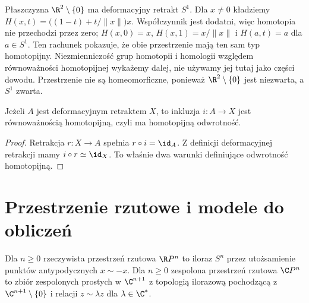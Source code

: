 \begin{przyklad}
Płaszczyzna $\R^2\setminus\{0\}$ ma deformacyjny retrakt $S^1$.
Dla $x\ne0$ kładziemy
$H(x,t)=\big((1-t)+t/\|x\|\big)x$.
Współczynnik jest dodatni, więc homotopia nie przechodzi przez zero;
$H(x,0)=x$, $H(x,1)=x/\|x\|$ i $H(a,t)=a$ dla $a\in S^1$.
Ten rachunek pokazuje, że obie przestrzenie mają ten sam
typ homotopijny. Niezmienniczość grup homotopii i homologii
względem równoważności homotopijnej wykażemy dalej,
nie używamy jej tutaj jako części dowodu.
Przestrzenie nie są homeomorficzne, ponieważ
$\R^2\setminus\{0\}$ jest niezwarta, a $S^1$ zwarta.
\end{przyklad}

\begin{twierdzenie}
Jeżeli $A$ jest deformacyjnym retraktem $X$, to inkluzja $i:A\to X$
jest równoważnością homotopijną, czyli ma homotopijną odwrotność.
\end{twierdzenie}
\begin{proof}
Retrakcja $r:X\to A$ spełnia $r\circ i=\id_A$.
Z definicji deformacyjnej retrakcji mamy $i\circ r\simeq\id_X$.
To właśnie dwa warunki definiujące odwrotność homotopijną.
\end{proof}

\section{Przestrzenie rzutowe i modele do obliczeń}

\begin{definicja}
Dla $n\geq0$ rzeczywista przestrzeń rzutowa $\R P^n$ to iloraz $S^n$ przez
utożsamienie punktów antypodycznych $x\sim-x$.
Dla $n\geq0$ zespolona przestrzeń rzutowa $\C P^n$ to zbiór zespolonych prostych
w $\C^{n+1}$ z topologią ilorazową pochodzącą z
$\C^{n+1}\setminus\{0\}$ i relacji $z\sim\lambda z$ dla $\lambda\in\C^*$.
\end{definicja}

